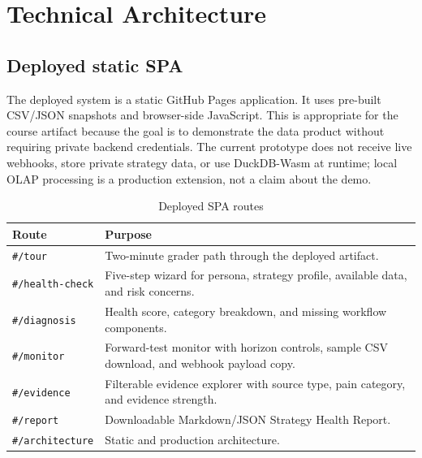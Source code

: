 \documentclass[11pt,a4paper]{article}
\begin{document}
\section{Technical Architecture}

\subsection{Deployed static SPA}

The deployed system is a static GitHub Pages application. It uses pre-built CSV/JSON snapshots and browser-side JavaScript. This is appropriate for the course artifact because the goal is to demonstrate the data product without requiring private backend credentials. The current prototype does not receive live webhooks, store private strategy data, or use DuckDB-Wasm at runtime; local OLAP processing is a production extension, not a claim about the demo.

\begin{table}[H]
\centering
\caption{Deployed SPA routes}
\small
\begin{tabularx}{\textwidth}{>{\raggedright\arraybackslash}p{3.1cm}X}
\toprule
\textbf{Route} & \textbf{Purpose} \\
\midrule
\texttt{\#/tour} & Two-minute grader path through the deployed artifact. \\
\texttt{\#/health-check} & Five-step wizard for persona, strategy profile, available data, and risk concerns. \\
\texttt{\#/diagnosis} & Health score, category breakdown, and missing workflow components. \\
\texttt{\#/monitor} & Forward-test monitor with horizon controls, sample CSV download, and webhook payload copy. \\
\texttt{\#/evidence} & Filterable evidence explorer with source type, pain category, and evidence strength. \\
\texttt{\#/report} & Downloadable Markdown/JSON Strategy Health Report. \\
\texttt{\#/architecture} & Static and production architecture. \\
\bottomrule
\end{tabularx}
\end{table}
\end{document}
